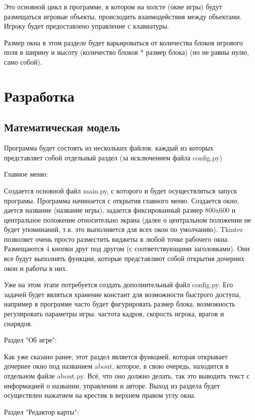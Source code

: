 Это основной цикл в программе, в котором на холсте (окне игры) будут размещаться игровые объекты, происходить взаимодействия между объектами. Игроку будет предоставлено управление с клавиатуры.

Размер окна в этом разделе будет варьироваться от количества блоков игрового поля в ширину и высоту (количество блоков * размер блока) (но не равны нулю, само собой).

\section{\label{sec:ch02/sec03}Разработка}
\subsection{\label{sec:ch02/sec03/sub01}Математическая модель}

Программа будет состоять из нескольких файлов, каждый из которых представляет собой отдельный раздел (за исключением файла config.py)

Главное меню:

Создается основной файл main.py, с которого и будет осуществляться запуск програмы. Программа начинается с открытия главного меню. Создается окно, дается название (название игры), задается фиксированный размер 800x600 и центральное положение относительно экрана (далее о центральном положении не будет упоминаний, т.к. это выполняется для всех окон по умолчанию). Tkinter позволяет очень просто разместить виджеты в любой точке рабочего окна. Размещаются 4 кнопки друг под другом (с соответствующими заголовками). Они все будут выполнять функции, которые представляют собой открытия дочерних окон и работы в них.

Уже на этом этапе потребуется создать дополнительный файл config.py. Его задачей будет являться хранение констант для возможности быстрого доступа, например в программе часто будет фигурировать размер блока, возможность регулировать параметры игры: частота кадров, скорость игрока, врагов и снарядов.

Раздел "Об игре":

Как уже сказано ранее, этот раздел является функцией, которая открывает дочернее окно под названием about, которое, в свою очередь, находится в отдельном файле about.py. Всё, что оно должно делать, так это выводить текст с информацией о названии, управлении и авторе. Выход из раздела будет осуществлен нажатием на крестик в верхнем правом углу окна.

Раздел "Редактор карты":

